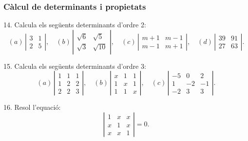 \documentclass[12pt]{article}
\begin{document}
\subsubsection{Càlcul de determinants i propietats}
\begin{exercici}
14. Calcula els següents determinants d'ordre 2:
\[
(a) \, \left| \begin{matrix} 3 & 1 \\ 2 & 5 \end{matrix} \right|, \quad 
(b) \, \left| \begin{matrix} \sqrt{6} & \sqrt{5} \\ \sqrt{3} & \sqrt{10} \end{matrix} \right|, \quad 
(c) \, \left| \begin{matrix} m+1 & m-1 \\ m-1 & m+1 \end{matrix} \right|, \quad 
(d) \, \left| \begin{matrix} 39 & 91 \\ 27 & 63 \end{matrix} \right|.
\]
\end{exercici}

\begin{exercici}
15. Calcula els següents determinants d'ordre 3:
\[
(a) \, \left| \begin{matrix} 1 & 1 & 1 \\ 1 & 2 & 2 \\ 2 & 2 & 3 \end{matrix} \right|, \quad 
(b) \, \left| \begin{matrix} x & 1 & 1 \\ 1 & x & 1 \\ 1 & 1 & x \end{matrix} \right|, \quad 
(c) \, \left| \begin{matrix} -5 & 0 & 2 \\ 1 & -2 & -1 \\ -2 & 3 & 3 \end{matrix} \right|.
\]
\end{exercici}

\begin{exercici}
16. Resol l'equació:
\[
\left| \begin{matrix} 1 & x & x \\ x & 1 & x \\ x & x & 1 \end{matrix} \right| = 0.
\]
\end{exercici}
\end{document}
